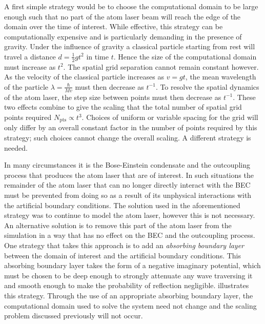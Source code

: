 A first simple strategy would be to choose the computational domain to be large enough such that no part of the atom laser beam will reach the edge of the domain over the time of interest. While effective, this strategy can be computationally expensive and is particularly demanding in the presence of gravity. Under the influence of gravity a classical particle starting from rest will travel a distance $d = \frac{1}{2}g t^2$ in time $t$. Hence the size of the computational domain must increase as $t^2$. The spatial grid separation cannot remain constant however. As the velocity of the classical particle increases as $v = gt$, the mean wavelength of the particle $\displaystyle \lambda = \frac{\hbar}{Mv}$ must then decrease as $t^{-1}$.  To resolve the spatial dynamics of the atom laser, the step size between points must then decrease as $t^{-1}$. These two effects combine to give the scaling that the total number of spatial grid points required $N_\text{pts} \propto t^3$. Choices of uniform or variable spacing for the grid will only differ by an overall constant factor in the number of points required by this strategy; such choices cannot change the overall scaling. A different strategy is needed.

In many circumstances it is the Bose-Einstein condensate and the outcoupling process that produces the atom laser that are of interest. In such situations the remainder of the atom laser that can no longer directly interact with the BEC must be prevented from doing so as a result of its unphysical interactions with the artificial boundary conditions. The solution used in the aforementioned strategy was to continue to model the atom laser, however this is not necessary. An alternative solution is to remove this part of the atom laser from the simulation in a way that has no effect on the BEC and the outcoupling process. One strategy that takes this approach is to add an \emph{absorbing boundary layer} \citep{Kosloff:1986,Neuhasuer:1989} between the domain of interest and the artificial boundary conditions. This absorbing boundary layer takes the form of a negative imaginary potential, which must be chosen to be deep enough to strongly attenuate any wave traversing it and smooth enough to make the probability of reflection negligible.  illustrates this strategy. Through the use of an appropriate absorbing boundary layer, the computational domain used to solve the system need not change and the scaling problem discussed previously will not occur.

